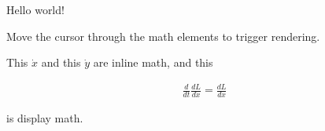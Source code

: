 \documentclass{article}
\begin{document}
Hello world!

Move the cursor through the math elements to trigger rendering.

This $\dot{x}$ and this \(\dot{y}\) are inline math, and this

\begin{align*}
\frac{d}{dt}\frac{dL}{d\dot{x}} = \frac{dL}{dx}
\end{align*}

is display math.
\end{document}
